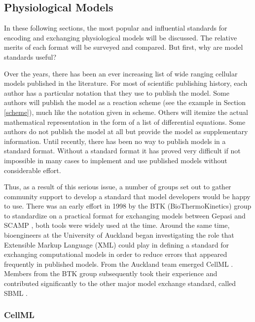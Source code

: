 \subsection{Physiological Models}

In these following sections, the most popular and influential standards
for encoding and exchanging physiological models will be discussed. The
relative merits of each format will be surveyed and compared. But first,
why are model standards useful?

Over the years, there has been an ever increasing list of wide ranging
cellular models published in the literature. For most of scientific
publishing history, each author has a particular notation that they use
to publish the model. Some authors will publish the model as a reaction
scheme (see the example in Section \ref{scheme}), much like the notation
given in scheme. Others will itemize the actual mathematical
representation in the form of a list of differential equations. Some
authors do not publish the model at all but provide the model as
supplementary information. Until recently, there has been no way to
publish models in a standard format. Without a standard format it has
proved very difficult if not impossible in many cases to implement and
use published models without considerable effort.

Thus, as a result of this serious issue, a number of groups set out to
gather community support to develop a standard that model developers
would be happy to use. There was an early effort in 1998 by the BTK
(BioThermoKinetics) group to standardize on a practical format for
exchanging models between Gepasi \autocite{Gepasi:1993} and SCAMP
\autocite{SauroF91}, both tools were widely used at the time. Around the
same time, bioengineers at the University of Auckland began
investigating the role that Extensible Markup Language (XML)
\autocite{harold:2001} could play in defining a standard for exchanging
computational models in order to reduce errors that appeared frequently
in published models. From the Auckland team emerged CellML
\autocite{LloydCellML2004}. Members from the BTK group subsequently took
their experience and contributed significantly to the other major model
exchange standard, called SBML \autocite{hucka:2002d}.

\subsubsection{CellML}

